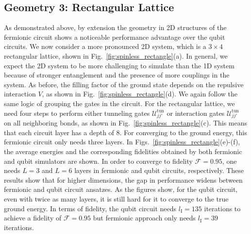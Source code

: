 \documentclass[aps, prx, reprint, superscriptaddress]{revtex4-2}
\begin{document}
\subsection{Geometry 3: Rectangular Lattice}
\label{subsec:spinless_2d}
As demonstrated above, by extension the geometry in 2D structures of the fermionic circuit shows a noticeable performance advantage over the qubit circuits.  We now consider a more pronounced  2D system, which is a $3{\times} 4$ rectangular lattice, shown in  Fig.~\ref{fig:spinless_rectangle}(a). In general, we expect the 2D system to be more challenging to simulate than the 1D system because of stronger entanglement and the presence of more couplings in the system.
As before, the filling factor of the ground state depends on the repulsive interaction $V$, as shown in Fig.~\ref{fig:spinless_rectangle}(d).  We again follow the same logic of grouping the gates in the circuit. For the rectangular lattice, we need four steps to perform either tunneling gates $\mathcal{U}^{\text{tun}}_{jj'}$ or interaction gates $\mathcal{U}^{\text{tun}}_{jj'}$ on all neighboring bonds, as shown in Fig.~\ref{fig:spinless_rectangle}(c). This means that each circuit layer has a depth of $8$. For converging to the ground energy, this fermionic circuit only needs three layers. 
In Figs.~\ref{fig:spinless_rectangle}(e)-(f), the average energies and the corresponding fidelities obtained by both fermionic and qubit simulators are shown. In order to converge to fidelity $\mathcal{F}{=}0.95$, one needs $L{=}3$ and $L{=}6$ layers in fermionic and qubit circuits, respectively. 
These results show that for higher dimensions, the gap in performance widens between fermionic and qubit circuit ansatzes.
As the figures show, for the qubit circuit, even with twice as many layers, it is still hard for it to converge to the true ground energy. In terms of fidelity, the qubit circuit needs $l_\text{I}{=}135$ iterations to achieve a fidelity of $\mathcal{F}{=}0.95$ but fermionic approach only needs $l_\text{I}{=}39$ iterations. 

\end{document}

